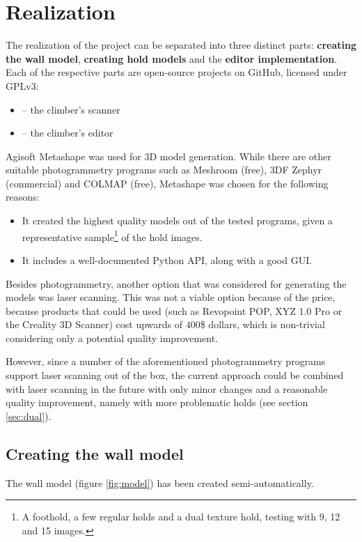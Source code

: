 \chapter{Realization}\label{sec:realization}

The realization of the project can be separated into three distinct parts: \textbf{creating the wall model}, \textbf{creating hold models} and the \textbf{editor implementation}.
Each of the respective parts are open-source projects on GitHub, licensed under GPLv3:
\begin{itemize}
	\item \raisebox{-0.08em}{} -- the climber's scanner \cite{clis}
	\item \raisebox{-0.08em}{} -- the climber's editor \cite{cled}
\end{itemize}

Agisoft Metashape was used for 3D model generation.
While there are other suitable photogrammetry programs such as Meshroom (free), 3DF Zephyr (commercial) and COLMAP (free), Metashape was chosen for the following reasons:
\begin{itemize}
	\item It created the highest quality models out of the tested programs, given a representative sample\footnote{A foothold, a few regular holds and a dual texture hold, testing with 9, 12 and 15 images.} of the hold images.
	\item It includes a well-documented Python API, along with a good GUI.
\end{itemize}

Besides photogrammetry, another option that was considered for generating the models was laser scanning.
This was not a viable option because of the price, because products that could be used (such as Revopoint POP, XYZ 1.0 Pro or the Creality 3D Scanner) cost upwards of $400$\$ dollars, which is non-trivial considering only a potential quality improvement.

However, since a number of the aforementioned photogrammetry programs support laser scanning out of the box, the current approach could be combined with laser scanning in the future with only minor changes and a reasonable quality improvement, namely with more problematic holds (see section \ref{sec:dual}).

\section{Creating the wall model}
The wall model (figure \ref{fig:model}) has been created semi-automatically.

